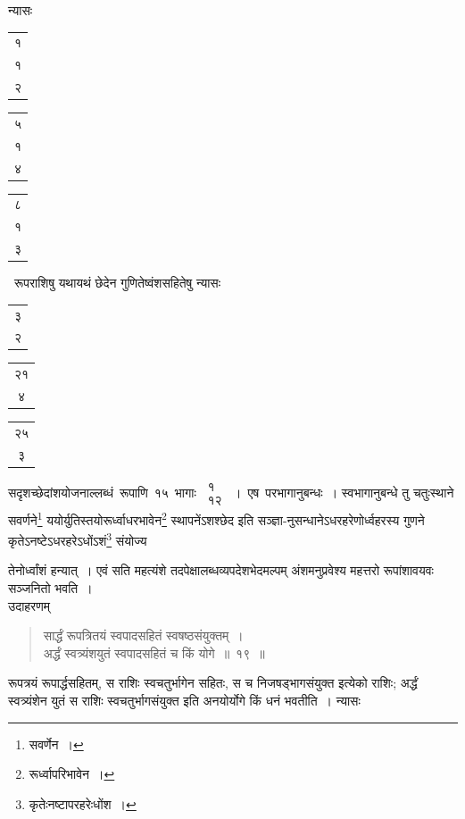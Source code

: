 \documentclass[10pt, openany]{book}
\begin{document}
{न्यासः\textendash ~\begin{tabular}{c|}१\\१\\२\end{tabular} \begin{tabular}{c|} ५\\१\\४\end{tabular} \begin{tabular}{c|} ८\\१\\३\end{tabular} ~रूपराशिषु \;यथायथं \;छेदेन \;गुणितेष्वंशसहितेषु \;न्यासः\textendash \,\begin{tabular}{c|}३\\२\end{tabular}\begin{tabular}{c|} २१\\४\end{tabular}\begin{tabular}{c|}२५\\३\end{tabular}\; सदृशच्छेदांशयोजनाल्लब्धं \,रूपाणि \,१५ \,भागाः \,$\begin{matrix}

\mbox{{१}}\\

\mbox{{१२}}

\end{matrix}$~। \,एष \,परभागानुबन्धः~। स्वभागानुबन्धे तु चतुःस्थाने सवर्णने\renewcommand{\thefootnote}{\s ५}\footnote{\s सवर्णेन~।}
ययोर्युतिस्तयोरूर्ध्वाधरभावेन\renewcommand{\thefootnote}{\s ६}\footnote{\s *रूर्ध्वापरिभावेन~।} स्थापनेंऽशश्छेद इति सञ्ज्ञा-नुसन्धानेऽधरहरेणोर्ध्वहरस्य गुणने
कृतेऽनष्टेऽधरहरेऽधोंऽशं\renewcommand{\thefootnote}{\s ७}\footnote{\s कृतेःनष्टापरहरेःधोंश~।} संयोज्य}
{तेनोर्ध्वांशं हन्यात्~। एवं सति महत्यंशे तदपेक्षालब्धव्यपदेशभेदमल्पम्
अंशमनुप्रवेश्य महत्तरो}
{रूपांशावयवः सञ्जनितो भवति~।}\\

{उदाहरणम्\textemdash}

\begin{quote}
    
{\eg सार्द्धं रूपत्रितयं स्वपादसहितं स्वषष्ठसंयुक्तम्~। \\
 अर्द्धं स्वत्र्यंशयुतं स्वपादसहितं च किं योगे~॥~१९~॥} \end{quote}

{रूपत्रयं रूपार्द्धसहितम्, स राशिः स्वचतुर्भागेन सहितः, स च
निजषड्भागसंयुक्त}
{इत्येको राशिः; अर्द्धं स्वत्र्यंशेन युतं स राशिः स्वचतुर्भागसंयुक्त इति
अनयोर्योगे किं धनं भवतीति~। न्यासः\textemdash}
\end{document}
